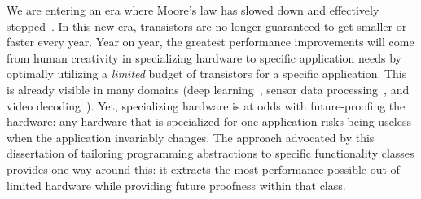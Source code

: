 We are entering an era where Moore's law has slowed down and effectively
stopped~\cite{dark_silicon, four_horsemen}. In this new era, transistors are no longer guaranteed to get smaller or
faster every year. Year on year, the greatest performance improvements will come from
human creativity in specializing hardware to specific application needs by
optimally utilizing a \textit{limited} budget of transistors for a
specific application. This is already visible in many domains (\eg deep
learning~\cite{tpu}, sensor data processing~\cite{m7}, and video
decoding~\cite{qualcomm_video}). Yet, specializing hardware is at odds with
future-proofing the hardware: any hardware that is specialized for one
application risks being useless when the application invariably changes.
The approach advocated by this dissertation of tailoring programming abstractions
to specific functionality classes provides one way around this: it extracts
the most performance possible out of limited hardware while providing future
proofness within that class.
